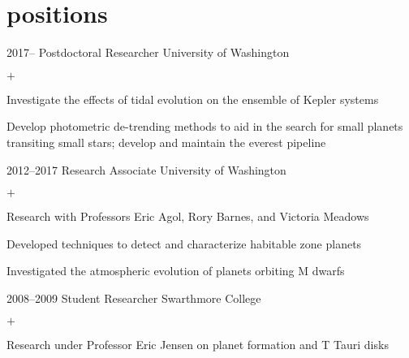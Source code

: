 \documentclass[]{luger-cv} %
\begin{document}
\section{positions}

\begin{entrylist}


\entry
{2017--}
{Postdoctoral Researcher}
{University of Washington}
{%
\vspace{-1em}
\begin{list}{$+$}{\cvlist}
\item Investigate the effects of tidal evolution on the ensemble of Kepler systems
\item Develop photometric de-trending methods to aid in the search for small
      planets transiting small stars; develop and maintain the everest pipeline
\end{list}
}


\entry
{2012--2017}
{Research Associate}
{University of Washington}
{%
\vspace{-1em}
\begin{list}{$+$}{\cvlist}
\item Research with Professors Eric Agol, Rory Barnes, and Victoria Meadows
\item Developed techniques to detect and characterize habitable
zone planets
\item Investigated the atmospheric evolution of planets orbiting M dwarfs
\end{list}
}


\ifdefined \onepage \else
\entry
{2008--2009}
{Student Researcher}
{Swarthmore College}
{%
\vspace{-1em}
\begin{list}{$+$}{\cvlist}
\item Research under Professor Eric Jensen on planet formation and T Tauri disks
\end{list}
}
\fi


\end{entrylist}

\end{document}
